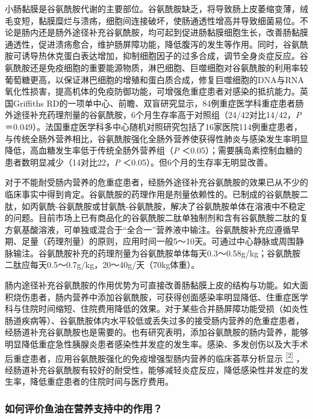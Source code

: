 小肠黏膜是谷氨酰胺代谢的主要部位。谷氨酰胺缺乏，将导致肠上皮萎缩变薄，绒毛变短，黏膜糜烂与溃疡，细胞间连接破坏，使肠通透性增高并导致细菌易位。不论是肠内还是肠外途径补充谷氨酰胺，均可起到促进肠黏膜细胞生长，改善肠黏膜通透性，促进溃疡愈合，维护肠屏障功能，降低腹泻的发生等作用。同时，谷氨酰胺可诱导热休克蛋白表达增加，抑制细胞因子的过多合成，调节全身炎症反应。谷氨酰胺还是免疫细胞的重要能源物质，淋巴细胞、巨噬细胞对谷氨酰胺的利用率较葡萄糖更高，以保证淋巴细胞的增殖和蛋白质合成，修复巨噬细胞的DNA与RNA氧化性损害，提高机体的免疫防御功能，可增强危重症患者对感染的抵抗能力。英国Griffiths
RD的一项单中心、前瞻、双盲研究显示，84例重症医学科重症患者肠外途径补充药理剂量的谷氨酰胺，6个月生存率高于对照组（24/42对比14/42，\emph{P}
＝0.049）。法国重症医学科多中心随机对照研究包括了16家医院114例重症患者，与传统全肠外营养相比，谷氨酰胺强化全肠外营养使获得性肺炎与感染发生率明显降低，高血糖发生率低于传统全肠外营养组（\emph{P}
＜0.05）；需要胰岛素控制血糖的患者数明显减少（14对比22，\emph{P}
＜0.05）。但6个月的生存率无明显改善。

对于不能耐受肠内营养的危重症患者，经肠外途径补充谷氨酰胺的效果已从不少的临床事实中得到肯定。谷氨酰胺的药理作用是剂量依赖性的。已制成的谷氨酰胺二肽，如丙氨酰-谷氨酰胺或甘氨酰-谷氨酰胺，解决了谷氨酰胺单体在溶液中不稳定的问题。目前市场上已有商品化的谷氨酰胺二肽单独制剂和含有谷氨酰胺二肽的复方氨基酸溶液，可单独或混合于“全合一”营养液中输注。谷氨酰胺补充应遵循早期、足量（药理剂量）的原则，应用时间一般5～10天。可通过中心静脉或周围静脉输注。谷氨酰胺补充的药理剂量为谷氨酰胺单体每天0.3～0.58g/kg；谷氨酰胺二肽应每天0.5～0.7g/kg，20～40g/天（70kg体重）。

肠内途径补充谷氨酰胺的作用优势为可直接改善肠黏膜上皮的结构与功能。如大面积烧伤患者，肠内营养中添加谷氨酰胺，可获得创面感染率明显降低、住重症医学科与住院时间缩短、住院费用降低的效果。对于某些合并肠屏障功能受损（如炎性肠道疾病等）、谷氨酰胺体内水平较低或丢失过多的接受肠内营养的危重症患者，经肠道补充谷氨酰胺也是需要的。也有研究表明，添加谷氨酰胺的肠内营养，能够明显降低重症急性胰腺炎患者感染性并发症的发生率。感染、多发创伤以及大手术后重症患者，应用谷氨酰胺强化的免疫增强型肠内营养的临床荟萃分析显示
\protect\hyperlink{text00028.htmlux5cux23ch2-27}{\textsuperscript{{[}2{]}}}
，经肠道补充谷氨酰胺有较好的耐受性，能够减轻炎症反应，降低感染性并发症的发生率，降低重症患者的住院时间与医疗费用。

\subsubsection{如何评价鱼油在营养支持中的作用？}

